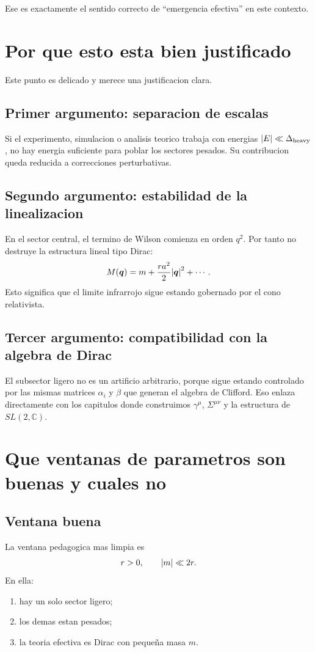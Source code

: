 Ese es exactamente el sentido correcto de \enquote{emergencia efectiva} en este contexto.

\section{Por que esto esta bien justificado}
Este punto es delicado y merece una justificacion clara.

\subsection{Primer argumento: separacion de escalas}
Si el experimento, simulacion o analisis teorico trabaja con energias \(\abs{E}\ll \Delta_{\text{heavy}}\), no hay energia suficiente para poblar los sectores pesados. Su contribucion queda reducida a correcciones perturbativas.

\subsection{Segundo argumento: estabilidad de la linealizacion}
En el sector central, el termino de Wilson comienza en orden \(q^2\). Por tanto no destruye la estructura lineal tipo Dirac:
\begin{equation}
M(\bm{q}) = m + \frac{ra^2}{2}\abs{\bm{q}}^2+\cdots.
\end{equation}
Esto significa que el limite infrarrojo sigue estando gobernado por el cono relativista.

\subsection{Tercer argumento: compatibilidad con la algebra de Dirac}
El subsector ligero no es un artificio arbitrario, porque sigue estando controlado por las mismas matrices \(\alpha_i\) y \(\beta\) que generan el algebra de Clifford. Eso enlaza directamente con los capitulos donde construimos \(\gamma^\mu\), \(\Sigma^{\mu\nu}\) y la estructura de \(SL(2,\mathbb{C})\).

\section{Que ventanas de parametros son buenas y cuales no}
\subsection{Ventana buena}
La ventana pedagogica mas limpia es
\begin{equation}
r>0,
\qquad
\abs{m}\ll 2r.
\end{equation}
En ella:
\begin{enumerate}[label=\arabic*.]
    \item hay un solo sector ligero;
    \item los demas estan pesados;
    \item la teoria efectiva es Dirac con peque\~na masa \(m\).
\end{enumerate}

